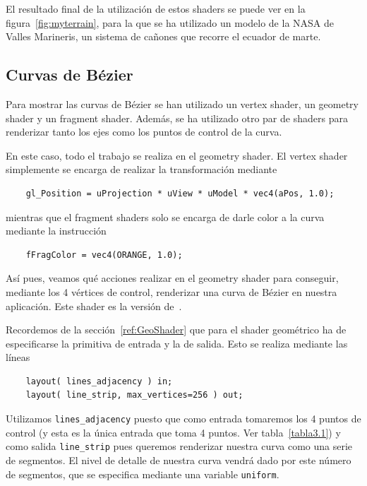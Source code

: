El resultado final de la utilización de estos shaders se puede ver en la
figura~\ref{fig:myterrain}, para la que se ha utilizado un modelo de la NASA de
Valles Marineris, un sistema de cañones que recorre el ecuador de marte.

\subsection{Curvas de Bézier}
\label{makereference5.5.2}

Para mostrar las curvas de Bézier se han utilizado un vertex shader, un geometry
shader y un fragment shader. Además, se ha utilizado otro par de shaders para
renderizar tanto los ejes como los puntos de control de la curva. 

En este caso, todo el trabajo se realiza en el geometry shader. El vertex shader
simplemente se encarga de realizar la transformación mediante

\begin{verbatim}
    gl_Position = uProjection * uView * uModel * vec4(aPos, 1.0);
\end{verbatim}

mientras que el fragment shaders solo se encarga de darle color a la curva
mediante la instrucción

\begin{verbatim}
    fFragColor = vec4(ORANGE, 1.0);
\end{verbatim}

Así pues, veamos qué acciones realizar en el geometry shader para conseguir,
mediante los 4 vértices de control, renderizar una curva de Bézier en nuestra
aplicación. Este shader es la versión de~\citet{Bailey}. 

Recordemos de la sección~\ref{ref:GeoShader} que para el shader geométrico ha de
especificarse la primitiva de entrada y la de salida. Esto se realiza mediante
las líneas

\begin{verbatim}
    layout( lines_adjacency ) in;
    layout( line_strip, max_vertices=256 ) out;
\end{verbatim}

Utilizamos \verb|lines_adjacency| puesto que como entrada tomaremos los 4 puntos
de control (y esta es la única entrada que toma 4 puntos. Ver
tabla~\ref{tabla3.1}) y como salida \verb|line_strip| pues queremos renderizar
nuestra curva como una serie de segmentos. El nivel de detalle de nuestra curva
vendrá dado por este número de segmentos, que se especifica mediante una
variable \verb|uniform|.

